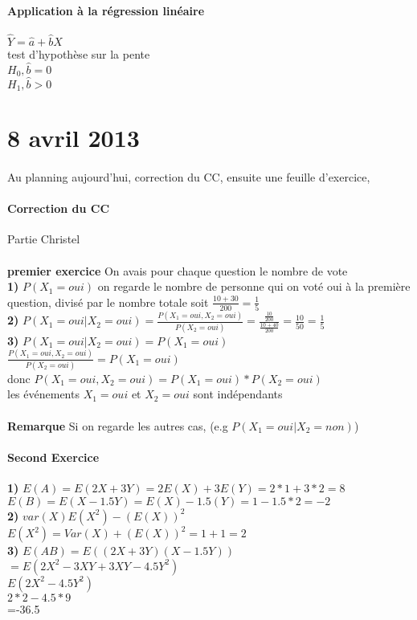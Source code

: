 \documentclass{article}
\begin{document}
\paragraph{Application à la régression linéaire}
$\hat{Y}= \hat{a}+\hat{b}X$\\test d'hypothèse sur la pente\\
$H_0,\hat{b}=0$\\
$H_1,\hat{b}>0$\\

\section{8 avril 2013}
\paragraph{} Au planning aujourd'hui, correction du CC, ensuite une feuille d'exercice, 
\paragraph{Correction du CC} Partie Christel\\\\
\textbf{premier exercice} On avais pour chaque question le nombre de vote\\
\textbf{1)} $P(X_1=oui)$ on regarde le nombre de personne qui on voté oui à la première question, divisé par le nombre totale soit $\frac{10+30}{200} =  \frac{1}{5}$\\
\textbf{2)} $P(X_1=oui |X_2 = oui)=  \frac{P(X_1=oui,X_2=oui)}{P(X_2=oui)} =  \frac{\frac{10}{200}}{\frac{10+40}{200	}} = \frac{10}{50} = \frac{1}{5}$ \\
\textbf{3)} $P(X_1=oui | X_2=oui) = P(X_1 = oui)$\\
$\frac{P(X_1=oui,X_2=oui)}{P(X_2=oui)} =P(X_1=oui)$\\
donc $P(X_1=oui,X_2=oui) = P(X_1=oui)*P(X_2=oui)$\\
les événements $X_1=oui$ et $X_2=oui$ sont indépendants\\\\
\textbf{Remarque} Si on regarde les autres cas, (e.g $P(X_1=oui|X_2=non)$)

\paragraph{Second Exercice} \textbf{1)} $E(A)= E(2X+3Y)  = 2E(X)+3E(Y) = 2*1+3*2=8$\\
$E(B) = E(X-1.5Y)=E(X) - 1.5(Y) = 1-1.5*2 = -2$\\
\textbf{2)} $var(X) E(X^2)-(E(X))^2$\\$E(X^2)=Var(X)+(E(X))^2 = 1+1 = 2$\\
\textbf{3)} $E(AB) = E((2X+3Y)(X-1.5Y))$\\$=E(2X^2-3XY+3XY-4.5Y^2)$\\
$E(2X^2-4.5Y^2)$\\
$2*2-4.5*9$\\=-36.5
\end{document}
